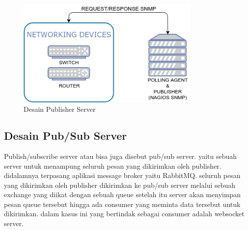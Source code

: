 			\begin{figure}[H]
				\centering
				\includegraphics[width=9cm]{Images/C-3/desainpublisher.png}
				\caption{Desain Publisher Server}
				\label{desain:desainpublisher}
			\end{figure}
                
		\subsection{Desain Pub/Sub Server}
			Publish/subscribe server atau bisa juga disebut pub/sub server. yaitu sebuah server untuk menampung seluruh pesan yang dikirimkan oleh publisher. didalamnya terpasang aplikasi message broker yaitu RabbitMQ. seluruh pesan yang dikirimkan oleh publisher dikirimkan ke pub/sub server melalui sebuah exchange yang diikat dengan sebuah queue setelah itu server akan menyimpan pesan queue tersebut hingga ada consumer yang meminta data tersebut untuk dikirimkan. dalam kasus ini yang bertindak sebagai consumer adalah websocket server.
			
